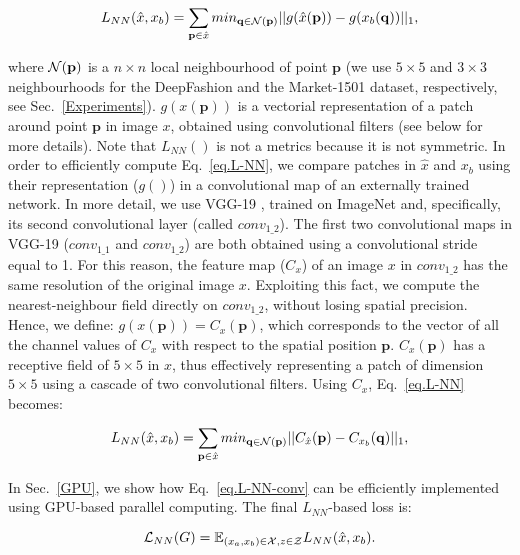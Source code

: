 \documentclass[10pt,twocolumn,letterpaper]{article}
\begin{document}
\begin{equation}
\label{eq.L-NN}
L_{NN} (\hat{x},x_b) = \sum_{\mathbf{p} \in \hat{x}}  min_{\mathbf{q} \in {\cal N}(\mathbf{p})} || g(\hat{x}(\mathbf{p})) -g(x_b (\mathbf{q})) ||_1,
\end{equation}

\noindent
where ${\cal N}(\mathbf{p})$ is a $n \times n$ local 
neighbourhood of point $\mathbf{p}$
(we use $5 \times 5$ and $3 \times 3$ neighbourhoods for the DeepFashion and the Market-1501 dataset, respectively, see Sec.~\ref{Experiments}).
$g(x (\mathbf{p}))$ is a vectorial representation of a patch around point $\mathbf{p}$ in image $x$, obtained using convolutional filters (see below for more details).
Note that $L_{NN}()$ is not a metrics because it is not symmetric. 
In order to efficiently compute Eq.~\ref{eq.L-NN}, we compare patches in $\hat{x}$ and $x_b$ using their representation
($g()$) in a  
convolutional map of an externally trained network.
In more detail, we use VGG-19 \cite{DBLP:journals/corr/SimonyanZ14a}, trained on ImageNet  and, specifically, its second convolutional layer (called $conv_{1\_2}$). The first two convolutional maps in VGG-19 ($conv_{1\_1}$ and  $conv_{1\_2}$) are both obtained using a convolutional stride equal to 1. For this reason, the feature map ($C_x$) of an image $x$ in  $conv_{1\_2}$ has the same resolution of the original image $x$. Exploiting this fact, we compute the nearest-neighbour field directly on  $conv_{1\_2}$, without losing spatial precision. 
Hence, we define: $g(x (\mathbf{p})) = C_x(\mathbf{p})$, which corresponds to the vector of all the channel values of $C_x$ with respect to the spatial position $\mathbf{p}$. $C_x(\mathbf{p})$ has a receptive field of $5 \times 5$ in $x$, thus effectively representing a patch of dimension $5 \times 5$ using a cascade of two convolutional filters. Using $C_x$, Eq.~\ref{eq.L-NN} becomes:


\begin{equation}
\label{eq.L-NN-conv}
L_{NN} (\hat{x},x_b) = \sum_{\mathbf{p} \in \hat{x}}  min_{\mathbf{q} \in {\cal N}( \mathbf{p})} ||C_{\hat{x}}(\mathbf{p}) - C_{x_b} (\mathbf{q}) ||_1,
\end{equation}

\noindent
 In Sec.~\ref{GPU},
 we show how Eq.~\ref{eq.L-NN-conv} can be efficiently implemented 
  using GPU-based parallel computing.
   The final $L_{NN}$-based loss is:

\begin{equation}
\label{eq.NN-loss}
{\cal L}_{NN}(G) = 
\mathbb{E}_{(x_a,x_b) \in {\cal X}, z \in {\cal Z}} L_{NN}(\hat{x},x_b).
\end{equation}
\end{document}
